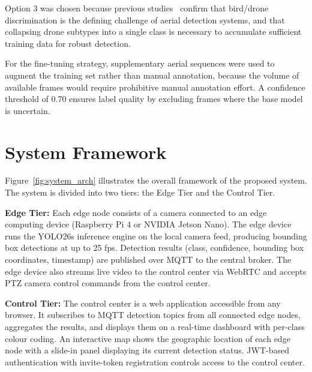\documentclass[12pt,a4paper]{report}
\begin{document}
Option 3 was chosen because previous studies~\cite{coluccia2021sensors,munir2023kfupm}
confirm that bird/drone discrimination is the defining challenge of aerial
detection systems, and that collapsing drone subtypes into a single class
is necessary to accumulate sufficient training data for robust detection.

For the fine-tuning strategy, supplementary aerial sequences were used to
augment the training set rather than manual annotation, because the volume
of available frames would require prohibitive manual annotation effort.
A confidence threshold of 0.70 ensures label quality by excluding frames
where the base model is uncertain.

\section{System Framework}

Figure~\ref{fig:system_arch} illustrates the overall framework of the
proposed system. The system is divided into two tiers: the Edge Tier and
the Control Tier.

\textbf{Edge Tier:} Each edge node consists of a camera connected to an
edge computing device (Raspberry Pi 4 or NVIDIA Jetson Nano). The edge
device runs the YOLO26s inference engine on the local camera feed, producing
bounding box detections at up to 25 fps. Detection results (class, confidence,
bounding box coordinates, timestamp) are published over MQTT to the central
broker. The edge device also streams live video to the control center via
WebRTC and accepts PTZ camera control commands from the control center.

\textbf{Control Tier:} The control center is a web application accessible
from any browser. It subscribes to MQTT detection topics from all connected
edge nodes, aggregates the results, and displays them on a real-time
dashboard with per-class colour coding. An interactive map shows the
geographic location of each edge node with a slide-in panel displaying
its current detection status. JWT-based authentication with invite-token
registration controls access to the control center.
\end{document}
